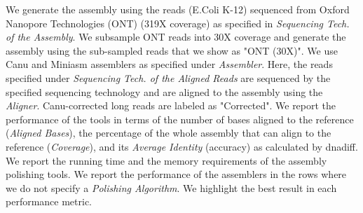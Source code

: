 \documentclass[a4paper]{article}
\begin{document}
\begin{table}[htb]
\begin{center}
{\begin{tabular}{|l|l|l|l|l||rrr|rr|}
\end{tabular}}
\end{center}
{\footnotesize We generate the assembly using the reads (E.Coli K-12) sequenced from Oxford Nanopore Technologies (ONT) (319X coverage) as specified in \textit{Sequencing Tech. of the Assembly}. We subsample ONT reads into 30X coverage and generate the assembly using the sub-sampled reads that we show as "ONT (30X)". We use Canu and Miniasm assemblers as specified under \textit{Assembler}. Here, the reads specified under \textit{Sequencing Tech. of the Aligned Reads} are sequenced by the specified sequencing technology and are aligned to the assembly using the \textit{Aligner}. Canu-corrected long reads are labeled as "Corrected". We report the performance of the tools in terms of the number of bases aligned to the reference (\textit{Aligned Bases}), the percentage of the whole assembly that can align to the reference (\textit{Coverage}), and its \textit{Average Identity} (accuracy) as calculated by dnadiff.  We report the running time and the memory requirements of the assembly polishing tools. We report the performance of the assemblers in the rows where we do not specify a \textit{Polishing Algorithm}. We highlight the best result in each performance metric.}
\end{table}
\end{document}
